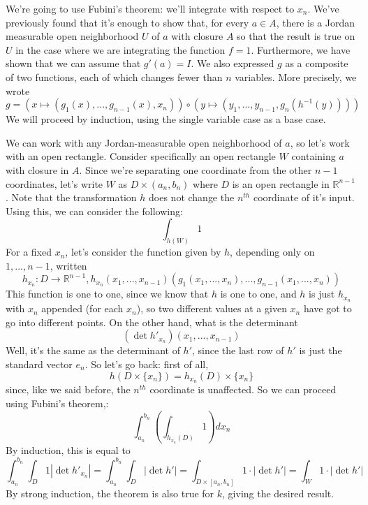 \documentclass{article}
\newcommand{\reals}[0]{\mathbb{R}}
\begin{document}
\begin{itemize}
  We're going to use Fubini's theorem: we'll integrate with respect to \(x_n\). We've previously found that it's enough to show that, for every \(a \in A\), there is a Jordan measurable open neighborhood \(U\) of \(a\) with closure \(A\) so that the result is true on \(U\) in the case where we are integrating the function \(f = 1\). Furthermore, we have shown that we can assume that \(g'(a) = I\). We also expressed \(g\) as a composite of two functions, each of which changes fewer than \(n\) variables. More precisely, we wrote
  \begin{equation}
    g = (x \mapsto  (g_1(x),...,g_{n - 1}(x), x_n)) \circ (y \mapsto (y_1,...,y_{n - 1},g_n(h^{-1}(y))))
  \end{equation}
  We will proceed by induction, using the single variable case as a base case.

  We can work with any Jordan-measurable open neighborhood of \(a\), so let's work with an open rectangle. Consider specifically an open rectangle \(W\) containing \(a\) with closure in \(A\). Since we're separating one coordinate from the other \(n - 1\) coordinates, let's write \(W\) as \(D \times (a_n, b_n)\) where \(D\) is an open rectangle in \(\reals^{n - 1}\). Note that the transformation \(h\) does not change the \(n^{th}\) coordinate of it's input. Using this, we can consider the following:
  \begin{equation}
    \int_{h(W)}1
  \end{equation}
  For a fixed \(x_n\), let's consider the function given by \(h\), depending only on \(1,...,n - 1\), written
  \begin{equation}
    h_{x_n} : D \to \reals^{n - 1},
    h_{x_n}(x_1,...,x_{n - 1})(g_1(x_1,...,x_n),...,g_{n - 1}(x_1,...,x_n))
  \end{equation}
  This function is one to one, since we know that \(h\) is one to one, and \(h\) is just \(h_{x_n}\) with \(x_n\) appended (for each \(x_n\)), so two different values at a given \(x_n\) have got to go into different points. On the other hand, what is the determinant
  \begin{equation}
    (\det h'_{x_n})(x_1,...,x_{n - 1})
  \end{equation}
  Well, it's the same as the determinant of \(h'\), since the last row of \(h'\) is just the standard vector \(e_n\). So let's go back: first of all,
  \begin{equation}
    h(D \times \{x_n\}) = h_{x_n}(D) \times \{x_n\}
  \end{equation}
  since, like we said before, the \(n^{th}\) coordinate is unaffected. So we can proceed using Fubini's theorem,:
  \begin{equation}
    \int_{a_n}^{b_n}\left(\int_{h_{x_n}(D)}1\right)dx_n
  \end{equation}
  By induction, this is equal to
  \begin{equation}
    \int_{a_n}^{b_n}\int_D1|\det h'_{x_n}| = \int_{a_n}^{b_n}\int_D|\det h'| = \int_{D \times [a_n, b_n]}1 \cdot |\det h'| = \int_W 1 \cdot |\det h'|
  \end{equation}
  By strong induction, the theorem is also true for \(k\), giving the desired result.


\end{itemize}
\end{document}
